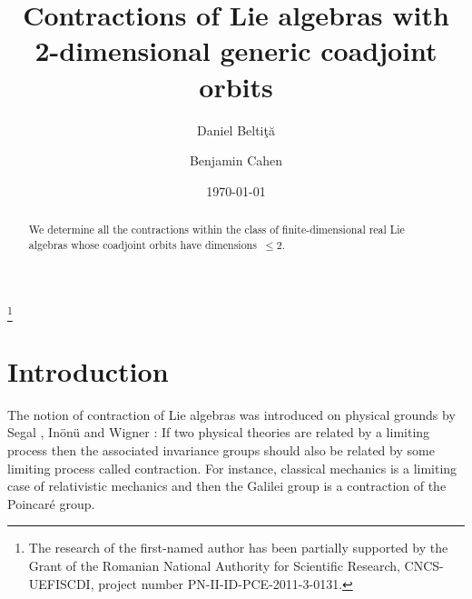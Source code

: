 \documentclass[
reqno]{amsart}
\begin{document}
\makeatletter
{}



\makeatother

\newtheorem{theorem}{Theorem}
\newtheorem{corollary}[theorem]{Corollary}
\newtheorem{definition}[theorem]{Definition}
\newtheorem{example}[theorem]{Example}
\newtheorem{lemma}[theorem]{Lemma}
\newtheorem{notation}[theorem]{Notation}
\newtheorem{problem}[theorem]{Problem}
\newtheorem{proposition}[theorem]{Proposition}
\newtheorem{remark}[theorem]{Remark}


\title[Contractions of Lie algebras with 2-dimensional coadjoint orbits]
{Contractions of Lie algebras with 2-dimensional generic coadjoint orbits}
\author{Daniel Belti\c t\u a}
\author{Benjamin Cahen}
\date{\today}
\address{Institute of Mathematics 
of the Romanian Academy,
P.O. Box 1-764, Bucharest, Romania}
\address{Laboratoire de Math\'ematiques et Applications de Metz, UMR 7122, 
Universit\'e de Lorraine (campus de Metz) et CNRS,
B\^at. A, Ile du Saulcy, F-57045 Metz Cedex 1, France}
\thanks{The research of the first-named author has been partially supported by the Grant
of the Romanian National Authority for Scientific Research, CNCS-UEFISCDI,
project number PN-II-ID-PCE-2011-3-0131.}

\begin{abstract}
We determine all the contractions within the class of finite-dim\-ension\-al real Lie algebras 
whose coadjoint orbits have dimensions~$\le2$.
\end{abstract}

\maketitle

\section{Introduction}

The notion of contraction of Lie algebras was introduced on physical grounds by Segal \cite{Se51}, In\"on\"u  and Wigner
\cite{IW53}: 
If two physical theories are related by a limiting process then the associated invariance groups should also be related
by some limiting process called contraction. 
For instance, classical mechanics is a limiting case of relativistic mechanics and then the Galilei group
is a contraction of the Poincar\'e group.
\end{document}
